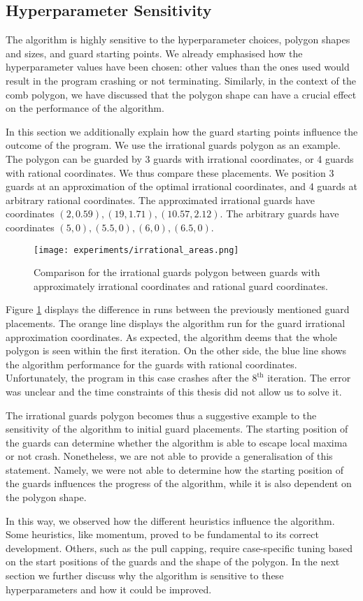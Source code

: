 \newpage
\subsection{Hyperparameter Sensitivity}
\label{sec:hyperparameters}
The algorithm is highly sensitive to the hyperparameter choices, polygon shapes and sizes, and guard starting points. We already emphasised how the hyperparameter values have been chosen: other values than the ones used would result in the program crashing or not terminating. Similarly, in the context of the comb polygon, we have discussed that the polygon shape can have a crucial effect on the performance of the algorithm.

In this section we  additionally explain how the guard starting points influence the outcome of the program. We  use the irrational guards polygon \cite{abrahamsen2021art} as an example.
The polygon can be guarded by 3 guards with irrational coordinates, or 4 guards with rational coordinates. We  thus compare these placements. We  position 3 guards at an approximation of the optimal irrational coordinates, and 4 guards at arbitrary rational coordinates. The approximated irrational guards  have coordinates $(2, 0.59), (19, 1.71), (10.57, 2.12)$. The arbitrary guards  have coordinates $(5, 0), (5.5, 0), (6, 0), (6.5, 0)$.

\begin{figure}[!h]
    \centering
    \texttt{[image: experiments/irrational\_areas.png]}
    \caption{Comparison for the irrational guards polygon between guards with approximately irrational coordinates and rational guard coordinates.}
    \label{fig:irrational}
\end{figure}

\newpage
Figure \ref{fig:irrational} displays the difference in runs between the previously mentioned guard placements. The orange line displays the algorithm run for the guard irrational approximation coordinates. As expected, the algorithm deems that the whole polygon is seen within the first iteration. On the other side, the blue line shows the algorithm performance for the guards with rational coordinates. Unfortunately, the program in this case crashes after the $8^{\text{th}}$ iteration. The error was unclear and the time constraints of this thesis did not allow us to solve it.

The irrational guards polygon becomes thus a suggestive example to the sensitivity of the algorithm to initial guard placements. The starting position of the guards can determine whether the algorithm is able to escape local maxima or not crash. Nonetheless, we are not able to provide a generalisation of this statement. Namely, we were not able to determine how the starting position of the guards influences the progress of the algorithm, while it is also dependent on the polygon shape.

In this way, we observed how the different heuristics influence the algorithm. Some heuristics, like momentum, proved to be fundamental to its correct development. Others, such as the pull capping, require case-specific tuning based on the start positions of the guards and the shape of the polygon.
In the next section we further discuss why the algorithm is sensitive to these hyperparameters and how it could be improved.